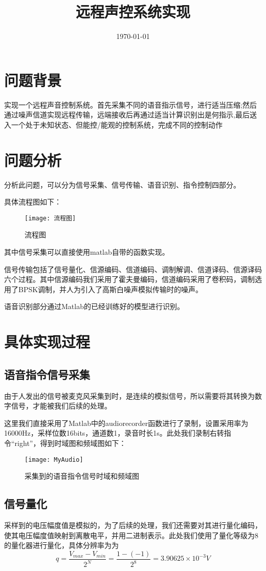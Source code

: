 \documentclass{../source/Experiment}
\title{远程声控系统实现}
\date{\today}
\begin{document}
    \makecover

    \section{问题背景}
    实现一个远程声音控制系统。首先采集不同的语音指示信号，进行适当压缩;然后通过噪声信道实现远程传输，远端接收后再通过适当计算识别出是何指示,最后送入一个处于未知状态、但能控/能观的控制系统，完成不同的控制动作

    \section{问题分析}
    分析此问题，可以分为信号采集、信号传输、语音识别、指令控制四部分。

    具体流程图如下：
    \begin{figure}[H]
        \centering
        \texttt{[image: 流程图]}
        \caption{流程图}
    \end{figure}
    其中信号采集可以直接使用matlab自带的函数实现。

    信号传输包括了信号量化、信源编码、信道编码、调制解调、信道译码、信源译码六个过程。其中信源编码我们采用了霍夫曼编码，信道编码采用了卷积码，调制选用了BPSK调制，并人为引入了高斯白噪声模拟传输时的噪声。

    语音识别部分通过Matlab的已经训练好的模型进行识别。

    \section{具体实现过程}
        \subsection{语音指令信号采集}
            由于人发出的信号被麦克风采集到时，是连续的模拟信号，所以需要将其转换为数字信号，才能被我们后续的处理。

            这里我们直接采用了Matlab中的audiorecorder函数进行了录制，设置采用率为16000Hz，采样位数16bits，通道数1，录音时长1s。此处我们录制右转指令“right”，得到时域图和频域图如下：

            \begin{figure}[H]
                \centering
                \texttt{[image: MyAudio]}
                \caption{采集到的语音指令信号时域和频域图}
            \end{figure}

        \subsection{信号量化}
            采样到的电压幅度值是模拟的，为了后续的处理，我们还需要对其进行量化编码，使其电压幅度值映射到离散电平，并用二进制表示。此处我们使用了量化等级为8的量化器进行量化，具体分辨率为为
            $$
            q = \frac{V_{max} - V_{min}}{2^N} = \frac{1- (-1)}{2^8} = 3.90625\times 10^{-3}V
            $$
\end{document}
